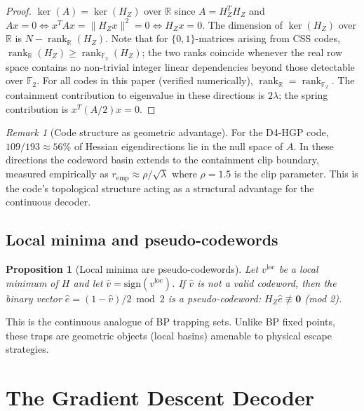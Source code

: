 \documentclass[12pt,a4paper]{article}
\theoremstyle{plain}
\newtheorem{proposition}[theorem]{Proposition}
\theoremstyle{definition}
\theoremstyle{remark}
\newtheorem{remark}[theorem]{Remark}
\newcommand{\GFtwo}{\mathbb{F}_2}
\newcommand{\R}{\mathbb{R}}
\newcommand{\HZ}{H_Z}
\newcommand{\rank}{\operatorname{rank}}
\begin{document}
\begin{proof}
$\ker(A) = \ker(\HZ)$ over $\R$ since $A = \HZ^T\HZ$ and
$Ax=0 \Leftrightarrow x^T A x = \|\HZ x\|^2 = 0 \Leftrightarrow \HZ x = 0$.
The dimension of $\ker(\HZ)$ over $\R$ is $N - \rank_{\R}(\HZ)$.
Note that for $\{0,1\}$-matrices arising from CSS codes, $\rank_{\R}(\HZ)
\geq \rank_{\GFtwo}(\HZ)$; the two ranks coincide whenever the real row
space contains no non-trivial integer linear dependencies beyond those
detectable over $\GFtwo$.
For all codes in this paper (verified numerically), $\rank_{\R} = \rank_{\GFtwo}$.
The containment contribution to eigenvalue in these directions is $2\lambda$;
the spring contribution is $x^T (A/2) x = 0$.
\end{proof}

\begin{remark}[Code structure as geometric advantage]
For the D4-HGP code, $109/193 \approx 56\%$ of Hessian eigendirections
lie in the null space of $A$.
In these directions the codeword basin extends to the containment clip
boundary, measured empirically as $r_{\mathrm{emp}} \approx \rho/\sqrt{\lambda}$
where $\rho = 1.5$ is the clip parameter.
This is the code's topological structure acting as a structural advantage
for the continuous decoder.
\end{remark}

\subsection{Local minima and pseudo-codewords}

\begin{proposition}[Local minima are pseudo-codewords]\label{prop:pseudo}
Let $v^{\mathrm{loc}}$ be a local minimum of $H$ and let
$\hat{v} = \mathrm{sign}(v^{\mathrm{loc}})$.
If $\hat{v}$ is not a valid codeword, then the binary vector
$\hat{e} = (1-\hat{v})/2 \bmod 2$ is a pseudo-codeword:
$\HZ\hat{e} \not\equiv \bm{0}$ (mod 2).
\end{proposition}

This is the continuous analogue of BP trapping sets.
Unlike BP fixed points, these traps are geometric objects (local basins)
amenable to physical escape strategies.

\section{The Gradient Descent Decoder}\label{sec:decoder}
\end{document}
